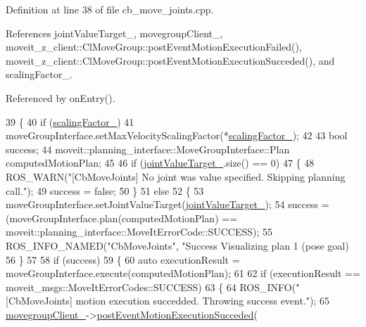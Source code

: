 Definition at line 38 of file cb\+\_\+move\+\_\+joints.\+cpp.



References joint\+Value\+Target\+\_\+, movegroup\+Client\+\_\+, moveit\+\_\+z\+\_\+client\+::\+Cl\+Move\+Group\+::post\+Event\+Motion\+Execution\+Failed(), moveit\+\_\+z\+\_\+client\+::\+Cl\+Move\+Group\+::post\+Event\+Motion\+Execution\+Succeded(), and scaling\+Factor\+\_\+.



Referenced by on\+Entry().


\begin{DoxyCode}
39   \{
40     \textcolor{keywordflow}{if} (\hyperlink{classmoveit__z__client_1_1CbMoveJoints_aadb5410711e277fab3a637cb4835fb3b}{scalingFactor\_})
41       moveGroupInterface.setMaxVelocityScalingFactor(*\hyperlink{classmoveit__z__client_1_1CbMoveJoints_aadb5410711e277fab3a637cb4835fb3b}{scalingFactor\_});
42 
43     \textcolor{keywordtype}{bool} success;
44     moveit::planning\_interface::MoveGroupInterface::Plan computedMotionPlan;
45 
46     \textcolor{keywordflow}{if} (\hyperlink{classmoveit__z__client_1_1CbMoveJoints_a0f52577dd2fccf25f36c4c93e733c0f4}{jointValueTarget\_}.size() == 0)
47     \{
48       ROS\_WARN(\textcolor{stringliteral}{"[CbMoveJoints] No joint was value specified. Skipping planning call."});
49       success = \textcolor{keyword}{false};
50     \}
51     \textcolor{keywordflow}{else}
52     \{
53       moveGroupInterface.setJointValueTarget(\hyperlink{classmoveit__z__client_1_1CbMoveJoints_a0f52577dd2fccf25f36c4c93e733c0f4}{jointValueTarget\_});
54       success = (moveGroupInterface.plan(computedMotionPlan) == 
      moveit::planning\_interface::MoveItErrorCode::SUCCESS);
55       ROS\_INFO\_NAMED(\textcolor{stringliteral}{"CbMoveJoints"}, \textcolor{stringliteral}{"Success Visualizing plan 1 (pose goal) %
56     \}
57 
58     \textcolor{keywordflow}{if} (success)
59     \{
60       \textcolor{keyword}{auto} executionResult = moveGroupInterface.execute(computedMotionPlan);
61 
62       \textcolor{keywordflow}{if} (executionResult == moveit\_msgs::MoveItErrorCodes::SUCCESS)
63       \{
64         ROS\_INFO(\textcolor{stringliteral}{"[CbMoveJoints] motion execution succedded. Throwing success event."});
65         \hyperlink{classmoveit__z__client_1_1CbMoveJoints_a2ce2e613b676025766dcd2f01ae50810}{movegroupClient\_}->\hyperlink{classmoveit__z__client_1_1ClMoveGroup_ad6b8f0acbe3d11b5c39a83911a3d95b8}{postEventMotionExecutionSucceded}(
}
\end{DoxyCode}
